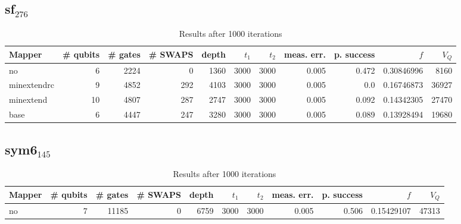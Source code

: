 \documentclass[11pt]{article}
\begin{document}
\subsection{sf\(_{\text{276}}\)}
\label{sec:orge0f2f8c}
\begin{table}[!htpb]
\caption{\label{tab:org37832ee}
Results after 1000 iterations}
\centering
\begin{tabular}{lrrrrrrrrrr}
\hline
Mapper & \# qubits & \# gates & \# SWAPS & depth & \(t_1\) & \(t_2\) & meas. err. & p. success & \(f\) & \(V_Q\)\\
\hline
no & 6 & 2224 & 0 & 1360 & 3000 & 3000 & 0.005 & 0.472 & 0.30846996 & 8160\\
\hline
minextendrc & 9 & 4852 & 292 & 4103 & 3000 & 3000 & 0.005 & 0.0 & 0.16746873 & 36927\\
minextend & 10 & 4807 & 287 & 2747 & 3000 & 3000 & 0.005 & 0.092 & 0.14342305 & 27470\\
base & 6 & 4447 & 247 & 3280 & 3000 & 3000 & 0.005 & 0.089 & 0.13928494 & 19680\\
\hline
\end{tabular}
\end{table}
\subsection{sym6\(_{\text{145}}\)}
\label{sec:orgf92bc44}
\begin{table}[!htpb]
\caption{\label{tab:org69e36a8}
Results after 1000 iterations}
\centering
\begin{tabular}{lrrrrrrrrrr}
\hline
Mapper & \# qubits & \# gates & \# SWAPS & depth & \(t_1\) & \(t_2\) & meas. err. & p. success & \(f\) & \(V_Q\)\\
\hline
no & 7 & 11185 & 0 & 6759 & 3000 & 3000 & 0.005 & 0.506 & 0.15429107 & 47313\\
\hline
\end{tabular}
\end{table}
\end{document}
